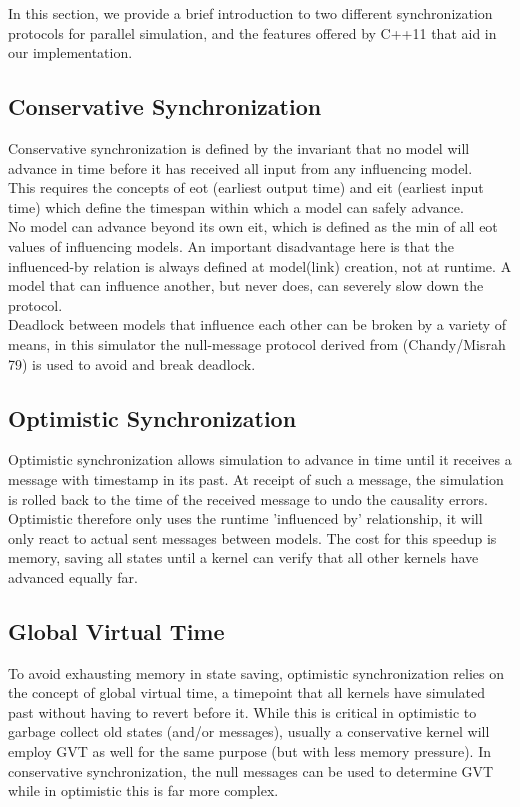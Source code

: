 In this section, we provide a brief introduction to two different synchronization protocols for parallel simulation, and the features offered by C++11 that aid in our implementation.

\subsection{Conservative Synchronization}
Conservative synchronization is defined by the invariant that no model will advance in time before it has received all input from any influencing model. \\
This requires the concepts of eot (earliest output time) and eit (earliest input time) which define the timespan within which a model can safely advance. \\
No model can advance beyond its own eit, which is defined as the min of all eot values of influencing models. An important disadvantage here is that the influenced-by relation is always defined at model(link) creation, not at runtime. A model that can influence another, but never does, can severely slow down the protocol.\\
Deadlock between models that influence each other can be broken by a variety of
means, in this simulator the null-message protocol derived from (Chandy/Misrah 79) is used to avoid and break deadlock.
\subsection{Optimistic Synchronization}
Optimistic synchronization allows simulation to advance in time until it receives a message with timestamp in its past. At receipt of such a message, the simulation is
rolled back to the time of the received message to undo the causality errors. Optimistic therefore only uses the runtime 'influenced by' relationship, it will only react to actual sent messages between models. The cost for this speedup is memory, saving all states until a kernel can verify that all other kernels have advanced equally far. 
\subsection{Global Virtual Time}
To avoid exhausting memory in state saving, optimistic synchronization relies on the concept of global virtual time, a timepoint that all kernels have simulated past without having to revert before it. While this is critical in optimistic to garbage collect old states (and/or messages), usually a conservative kernel will employ GVT as well for the same purpose (but with less memory pressure). In conservative synchronization, the null messages can be used to determine GVT while in optimistic this is far more complex.

